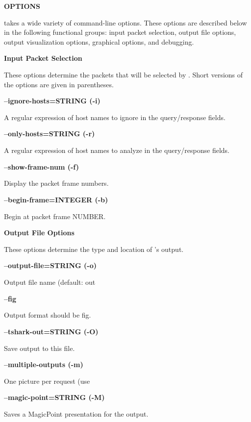 {\bf OPTIONS}

 takes a wide variety of command-line options.  These options
are described below in the following functional groups:  input packet
selection, output file options, output visualization options, graphical
options, and debugging.

{\bf Input Packet Selection}

These options determine the packets that will be selected by .
Short versions of the options are given in parentheses.

\begin{description}

\item {\bf --ignore-hosts=STRING (-i)}\verb" "

A regular expression of host names to ignore in the query/response fields.

\item {\bf --only-hosts=STRING (-r)}\verb" "

A regular expression of host names to analyze in the query/response fields.

\item {\bf --show-frame-num (-f)}\verb" "

Display the packet frame numbers.

\item {\bf --begin-frame=INTEGER (-b)}\verb" "

Begin at packet frame NUMBER.

\end{description}

{\bf Output File Options}

These options determine the type and location of 's output.

\begin{description}

\item {\bf --output-file=STRING (-o)}\verb" "

Output file name (default: out%

\item {\bf --fig}\verb" "

Output format should be fig.

\item {\bf --tshark-out=STRING (-O)}\verb" "

Save  output to this file.

\item {\bf --multiple-outputs (-m)}\verb" "

One picture per request (use %

\item {\bf --magic-point=STRING (-M)}\verb" "

Saves a MagicPoint presentation for the output.

\end{description}

